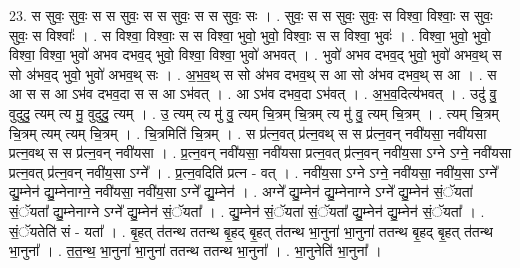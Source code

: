 \documentclass[17pt]{extarticle}
\begin{document}
23. स सुवः॒ सुवः॒ स स सुवः॒ स स सुवः॒ स स सुवः॒ सः । . सुवः॒ स स सुवः॒ सुवः॒ स विश्वा॒ विश्वाः॒ स सुवः॒ सुवः॒ स विश्वाः᳚ । . स विश्वा॒ विश्वाः॒ स स विश्वा॒ भुवो॒ भुवो॒ विश्वाः॒ स स विश्वा॒ भुवः॑ । . विश्वा॒ भुवो॒ भुवो॒ विश्वा॒ विश्वा॒ भुवो॑ अभव दभव॒द् भुवो॒ विश्वा॒ विश्वा॒ भुवो॑ अभवत् । . भुवो॑ अभव दभव॒द् भुवो॒ भुवो॑ अभव॒थ् स सो अ॑भव॒द् भुवो॒ भुवो॑ अभव॒थ् सः । . अ॒भ॒व॒थ् स सो अ॑भव दभव॒थ् स आ सो अ॑भव दभव॒थ् स आ । . स आ स स आ ऽभ॑व दभव॒दा स स आ ऽभ॑वत् । . आ ऽभ॑व दभव॒दा ऽभ॑वत् । . अ॒भ॒व॒दित्य॑भवत् । . उदु॑ वु॒ वुदुदु॒ त्यम् त्य मु॒ वुदुदु॒ त्यम् । . उ॒ त्यम् त्य मु॑ वु॒ त्यम् चि॒त्रम् चि॒त्रम् त्य मु॑ वु॒ त्यम् चि॒त्रम् । . त्यम् चि॒त्रम् चि॒त्रम् त्यम् त्यम् चि॒त्रम् । . चि॒त्रमिति॑ चि॒त्रम् । . स प्र॑त्न॒वत् प्र॑त्न॒वथ् स स प्र॑त्न॒वन् नवी॑यसा॒ नवी॑यसा प्रत्न॒वथ् स स प्र॑त्न॒वन् नवी॑यसा । . प्र॒त्न॒वन् नवी॑यसा॒ नवी॑यसा प्रत्न॒वत् प्र॑त्न॒वन् नवी॑य॒सा ऽग्ने ऽग्ने॒ नवी॑यसा प्रत्न॒वत् प्र॑त्न॒वन् नवी॑य॒सा ऽग्ने᳚ । . प्र॒त्न॒वदिति॑ प्रत्न - वत् । . नवी॑य॒सा ऽग्ने ऽग्ने॒ नवी॑यसा॒ नवी॑य॒सा ऽग्ने᳚ द्यु॒म्नेन॑ द्यु॒म्नेनाग्ने॒ नवी॑यसा॒ नवी॑य॒सा ऽग्ने᳚ द्यु॒म्नेन॑ । . अग्ने᳚ द्यु॒म्नेन॑ द्यु॒म्नेनाग्ने ऽग्ने᳚ द्यु॒म्नेन॑ सं॒ॅयता॑ सं॒ॅयता᳚ द्यु॒म्नेनाग्ने ऽग्ने᳚ द्यु॒म्नेन॑ सं॒ॅयता᳚ । . द्यु॒म्नेन॑ सं॒ॅयता॑ सं॒ॅयता᳚ द्यु॒म्नेन॑ द्यु॒म्नेन॑ सं॒ॅयता᳚ । . सं॒ॅयतेति॑ सं - यता᳚ । . बृ॒हत् त॑तन्थ ततन्थ बृ॒हद् बृ॒हत् त॑तन्थ भा॒नुना॑ भा॒नुना॑ ततन्थ बृ॒हद् बृ॒हत् त॑तन्थ भा॒नुना᳚ । . त॒त॒न्थ॒ भा॒नुना॑ भा॒नुना॑ ततन्थ ततन्थ भा॒नुना᳚ । . भा॒नुनेति॑ भा॒नुना᳚ । \newline
\end{document}
